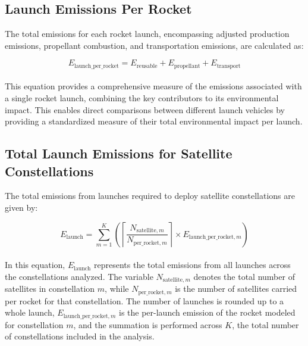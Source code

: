 \documentclass[pdflatex,sn-mathphys-num]{sn-jnl}
\theoremstyle{thmstyleone}%
\theoremstyle{thmstyletwo}%
\theoremstyle{thmstylethree}%
\begin{document}
\subsection{Launch Emissions Per Rocket}

The total emissions for each rocket launch, encompassing adjusted production emissions, propellant combustion, and transportation emissions, are calculated as:

\begin{equation}
E_{\text{launch\_per\_rocket}} = E_{\text{reusable}} + E_{\text{propellant}} + E_{\text{transport}}
\end{equation}
\\
This equation provides a comprehensive measure of the emissions associated with a single rocket launch, combining the key contributors to its environmental impact. This enables direct comparisons between different launch vehicles by providing a standardized measure of their total environmental impact per launch.

\subsection{Total Launch Emissions for Satellite Constellations}\label{sec:launches}

The total emissions from launches required to deploy satellite constellations are given by:

\begin{equation}
E_{\text{launch}} = \sum_{m=1}^{K} \left( \left\lceil \frac{N_{\text{satellite},m}}{N_{\text{per\_rocket},m}} \right\rceil \times E_{\text{launch\_per\_rocket},m} \right)
\end{equation}
\\
In this equation, \( E_{\text{launch}} \) represents the total emissions from all launches across the constellations analyzed. The variable \( N_{\text{satellite},m} \) denotes the total number of satellites in constellation \( m \), while \( N_{\text{per\_rocket},m} \) is the number of satellites carried per rocket for that constellation. The number of launches is rounded up to a whole launch, \( E_{\text{launch\_per\_rocket},m} \) is the per-launch emission of the rocket modeled for constellation \( m \), and the summation is performed across \( K \), the total number of constellations included in the analysis.
\end{document}
